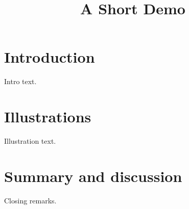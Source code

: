 \documentclass[article]{jss}
\title{A Short Demo}
\begin{document}
\section{Introduction}
Intro text.
\section{Illustrations}
Illustration text.
\section{Summary and discussion}
Closing remarks.

\end{document}
